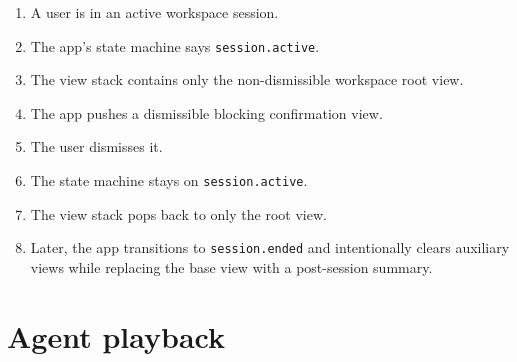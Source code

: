 \begin{enumerate}
\def\labelenumi{\arabic{enumi}.}
\tightlist
\item
  A user is in an active workspace session.
\item
  The app's state machine says \texttt{s\allowbreak{}e\allowbreak{}s\allowbreak{}s\allowbreak{}i\allowbreak{}o\allowbreak{}n\allowbreak{}.\allowbreak{}a\allowbreak{}c\allowbreak{}t\allowbreak{}i\allowbreak{}v\allowbreak{}e}.
\item
  The view stack contains only the non-dismissible workspace root view.
\item
  The app pushes a dismissible blocking confirmation view.
\item
  The user dismisses it.
\item
  The state machine stays on \texttt{s\allowbreak{}e\allowbreak{}s\allowbreak{}s\allowbreak{}i\allowbreak{}o\allowbreak{}n\allowbreak{}.\allowbreak{}a\allowbreak{}c\allowbreak{}t\allowbreak{}i\allowbreak{}v\allowbreak{}e}.
\item
  The view stack pops back to only the root view.
\item
  Later, the app transitions to \texttt{s\allowbreak{}e\allowbreak{}s\allowbreak{}s\allowbreak{}i\allowbreak{}o\allowbreak{}n\allowbreak{}.\allowbreak{}e\allowbreak{}n\allowbreak{}d\allowbreak{}e\allowbreak{}d} and intentionally clears auxiliary views while replacing the base view with a post-session summary.
\end{enumerate}

\section{Agent playback}\label{record-150-agent-playback}

